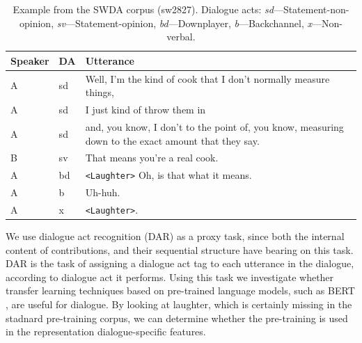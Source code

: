 \documentclass[11pt,a4paper]{article}
\begin{document}
\begin{table}
      \small
  \centering
  \begin{tabularx}{\linewidth}{llL}
    \toprule
    Speaker & DA & Utterance \\ \midrule
    A	&sd	& Well, I'm the kind of cook that I don't normally measure things,  \\
    A	&sd	& I just kind of throw them in \\
    A	&sd	& and, you know, I don't to the point of, you know, measuring down to the exact amount that they say.  \\
    B	&sv	& That means you're a real cook. \\
    A	&bd	& \texttt{<Laughter>} Oh, is that what it means.  \\
    A	&b	& Uh-huh.  \\
    A	&x	& \texttt{<Laughter>}.\\
             \bottomrule
  \end{tabularx}
  \caption{Example from the SWDA corpus (sw2827). Dialogue acts: \emph{sd}---Statement-non-opinion, \emph{sv}---Statement-opinion, \emph{bd}---Downplayer, \emph{b}---Backchannel, \emph{x}---Non-verbal. }
  \label{table:example}
\end{table}

We use dialogue act recognition (DAR) as a proxy task, since both the internal content of contributions, and their sequential structure have bearing on this task. DAR is the task of assigning a dialogue act tag to each utterance in the dialogue, according to dialogue act it performs.
Using this task we investigate whether transfer learning techniques based on pre-trained language models, such as BERT \citep{devlinBERTPretrainingDeep2018}, are useful for dialogue. 
By looking at laughter, which is certainly missing in the stadnard pre-training corpus, we can determine whether the pre-training is used in the representation dialogue-specific features.
\end{document}
